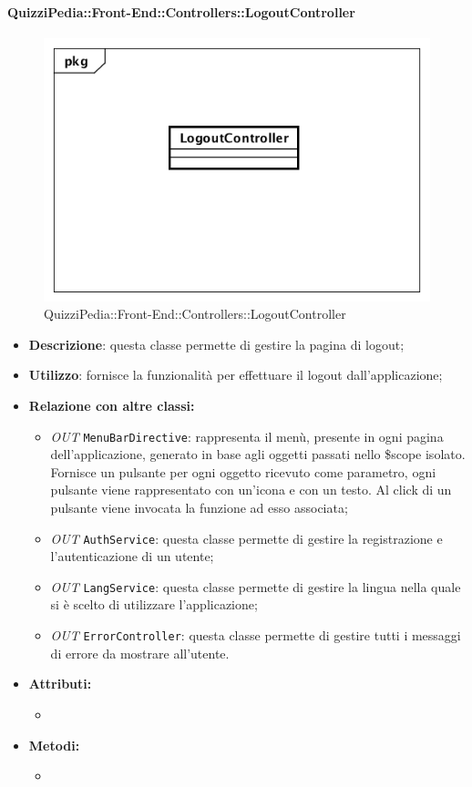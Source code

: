 \paragraph{QuizziPedia::Front-End::Controllers::LogoutController}
\begin{figure}
	\centering
	\includegraphics[scale=0.45]{UML/Classi/Front-End/QuizziPedia_Front-end_Controller_LogoutController.png}
	\caption{QuizziPedia::Front-End::Controllers::LogoutController}
\end{figure}
\begin{itemize}
	\item \textbf{Descrizione}: questa classe permette di gestire la pagina di logout;
	\item \textbf{Utilizzo}: fornisce la funzionalità per effettuare il logout dall'applicazione;
	\item \textbf{Relazione con altre classi:}
	\begin{itemize}
		\item \textit{OUT} \texttt{MenuBarDirective}: rappresenta il menù, presente in ogni pagina dell'applicazione, generato in base agli oggetti passati nello \$scope isolato. Fornisce un pulsante per ogni oggetto ricevuto come parametro, ogni pulsante viene rappresentato con un’icona e con un testo. Al click di un pulsante viene invocata la funzione ad esso associata;
		\item \textit{OUT} \texttt{AuthService}: questa classe permette di gestire la registrazione e l'autenticazione di un utente;
		\item \textit{OUT} \texttt{LangService}: questa classe permette di gestire la lingua nella quale si è scelto di utilizzare l'applicazione;
		\item \textit{OUT} \texttt{ErrorController}: questa classe permette di gestire tutti i messaggi di errore da mostrare all'utente.
	\end{itemize}
	\item \textbf{Attributi:}
	\begin{itemize}
		\item 
	\end{itemize}
	\item \textbf{Metodi:}
	\begin{itemize}
		\item 
	\end{itemize}
\end{itemize}


